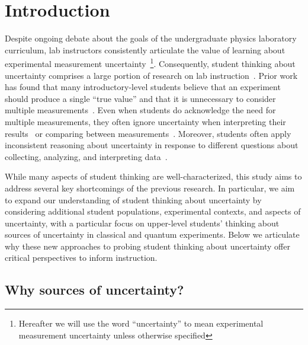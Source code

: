 \documentclass[english,aps,prstper,reprint,showpacs,longbibliography,superscriptaddress,nofootinbib]{revtex4-2}
\begin{document}
\section{Introduction}

Despite ongoing debate about the goals of the undergraduate physics laboratory curriculum, lab instructors consistently articulate the value of learning about experimental measurement uncertainty~\cite{AAPT1997,AAPT2014,Pollard2021}\footnote{Hereafter we will use the word ``uncertainty'' to mean experimental measurement uncertainty unless otherwise specified}. Consequently, student thinking about uncertainty comprises a large portion of research on lab instruction~\cite{HolmesTBD}. Prior work has found that many introductory-level students believe that an experiment should produce a single ``true value'' and that it is unnecessary to consider multiple measurements~\cite{Hull2021,Sere1993,Evangelinos1999,Leach1998,Buffler2001,Allie1998,Lubben2001}. Even when students do acknowledge the need for multiple measurements, they often ignore uncertainty when interpreting their results~\cite{Buffler2001,Leach1998,Pollard2020,Volkwyn2008,Lubben2001,Allie1998,vanKampen2021} or comparing between measurements~\cite{Buffler2001,Lubben2001,Allie1998,Kung2005,Pollard2020,Volkwyn2008,Etkina2008}.
Moreover, students often apply inconsistent reasoning about uncertainty in response to different questions about collecting, analyzing, and interpreting data~\cite{Buffler2001,Allie1998,Lubben2001}.  

While many aspects of student thinking are well-characterized, this study aims to address several key shortcomings of the previous research. In particular, we aim to expand our understanding of student thinking about uncertainty by considering additional student populations, experimental contexts, and aspects of uncertainty, with a particular focus on upper-level students' thinking about sources of uncertainty in classical and quantum experiments. Below we articulate why these new approaches to probing student thinking about uncertainty offer critical perspectives to inform instruction.

\subsection{Why sources of uncertainty?}
\end{document}
